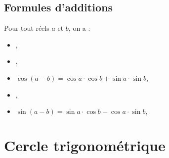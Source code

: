             \subsection{Formules d'additions}
                  Pour tout r\'eels $a$ et $b$, on a : 
                  \begin{itemize}
                        \item {},
                        \item {},
                        \item $\cos (a-b) = \cos a \cdot \cos b + \sin a \cdot \sin b$,
                        \item {},
                        \item $\sin (a-b) = \sin a \cdot \cos b - \cos a \cdot \sin b$,
                  \end{itemize}


      \section{Cercle trigonom\'etrique}
